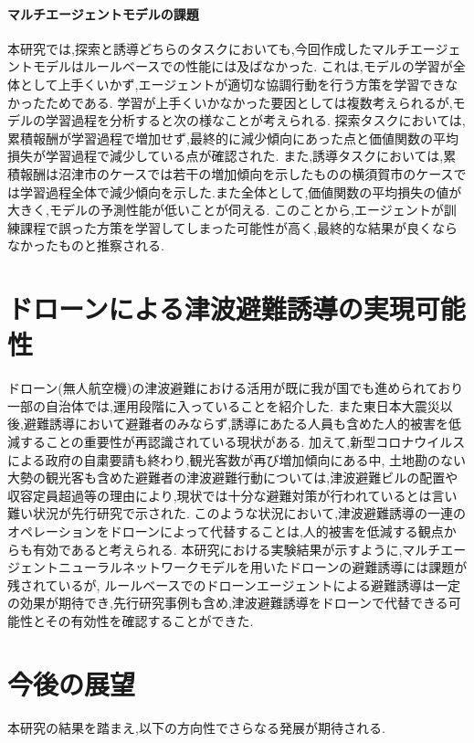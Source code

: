 \paragraph{マルチエージェントモデルの課題}
本研究では,探索と誘導どちらのタスクにおいても,今回作成したマルチエージェントモデルはルールベースでの性能には及ばなかった.
これは,モデルの学習が全体として上手くいかず,エージェントが適切な協調行動を行う方策を学習できなかったためである.
学習が上手くいかなかった要因としては複数考えられるが,モデルの学習過程を分析すると次の様なことが考えられる.
探索タスクにおいては,累積報酬が学習過程で増加せず,最終的に減少傾向にあった点と価値関数の平均損失が学習過程で減少している点が確認された.
また,誘導タスクにおいては,累積報酬は沼津市のケースでは若干の増加傾向を示したものの横須賀市のケースでは学習過程全体で減少傾向を示した.また全体として,価値関数の平均損失の値が大きく,モデルの予測性能が低いことが伺える.
このことから,エージェントが訓練課程で誤った方策を学習してしまった可能性が高く,最終的な結果が良くならなかったものと推察される.

\section{ドローンによる津波避難誘導の実現可能性}
ドローン(無人航空機)の津波避難における活用が既に我が国でも進められており一部の自治体では,運用段階に入っていることを紹介した.
また東日本大震災以後,避難誘導において避難者のみならず,誘導にあたる人員も含めた人的被害を低減することの重要性が再認識されている現状がある.
加えて,新型コロナウイルスによる政府の自粛要請も終わり,観光客数が再び増加傾向にある中,
土地勘のない大勢の観光客も含めた避難者の津波避難行動については,津波避難ビルの配置や収容定員超過等の理由により,現状では十分な避難対策が行われているとは言い難い状況が先行研究で示された.
このような状況において,津波避難誘導の一連のオペレーションをドローンによって代替することは,人的被害を低減する観点からも有効であると考えられる.
本研究における実験結果が示すように,マルチエージェントニューラルネットワークモデルを用いたドローンの避難誘導には課題が残されているが,
ルールベースでのドローンエージェントによる避難誘導は一定の効果が期待でき,先行研究事例も含め,津波避難誘導をドローンで代替できる可能性とその有効性を確認することができた.
\section{今後の展望}
本研究の結果を踏まえ,以下の方向性でさらなる発展が期待される.

